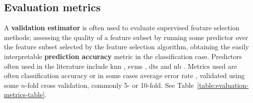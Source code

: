 \documentclass[../main.tex]{subfiles}
\begin{document}
\subsection{Evaluation metrics}
A \textbf{validation estimator} is often used to evaluate supervised feature selection methods; assessing the quality of a feature subset by running some predictor over the feature subset selected by the feature selection algorithm, obtaining the easily interpretable \textbf{prediction accuracy} metric in the classification case. Predictors often used in the literature include \gls{knn} \citep{al-tashi_review_2020} \citep{mafarja_dragonfly_2020}, \glspl{svm} \citep{chandrashekar_survey_2014}, \glspl{dt} \citep{li_feature_2017} and \gls{nb} \citep{koller_toward_1996}. Metrics used are often classification accuracy or in some cases average error rate \citep{khurma_evolopy-fs_2020}, validated using some $n$-fold cross validation, commonly 5- or 10-fold. See Table~\ref{table:evaluation-metrics-table}.
\end{document}
